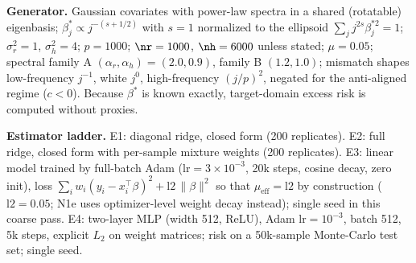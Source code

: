 \textbf{Generator.} Gaussian covariates with power-law spectra in a shared (rotatable) eigenbasis; $\beta^*_j \propto j^{-(s+1/2)}$ with $s=1$ normalized to the ellipsoid $\sum_j j^{2s}\beta_j^{*2}=1$; $\sigma_r^2=1$, $\sigma_h^2=4$; $p=1000$; $\nr=1000$, $\nh=6000$ unless stated; $\mu=0.05$; spectral family A $(\alpha_r,\alpha_h)=(2.0,0.9)$, family B $(1.2,1.0)$; mismatch shapes low-frequency $j^{-1}$, white $j^0$, high-frequency $(j/p)^2$, negated for the anti-aligned regime ($c<0$).
Because $\beta^*$ is known exactly, target-domain excess risk is computed without proxies.

\textbf{Estimator ladder.} E1: diagonal ridge, closed form (200 replicates). E2: full ridge, closed form with per-sample mixture weights (200 replicates). E3: linear model trained by full-batch Adam ($\mathrm{lr}=3\times10^{-3}$, 20k steps, cosine decay, zero init), loss $\sum_i w_i(y_i-x_i^\top\beta)^2 + \mathrm{l2}\,\|\beta\|^2$ so that $\mu_{\mathrm{eff}}=\mathrm{l2}$ by construction ($\mathrm{l2}=0.05$; N1e uses optimizer-level weight decay instead); single seed in this coarse pass. E4: two-layer MLP (width 512, ReLU), Adam $\mathrm{lr}=10^{-3}$, batch 512, 5k steps, explicit $L_2$ on weight matrices; risk on a 50k-sample Monte-Carlo test set; single seed.

